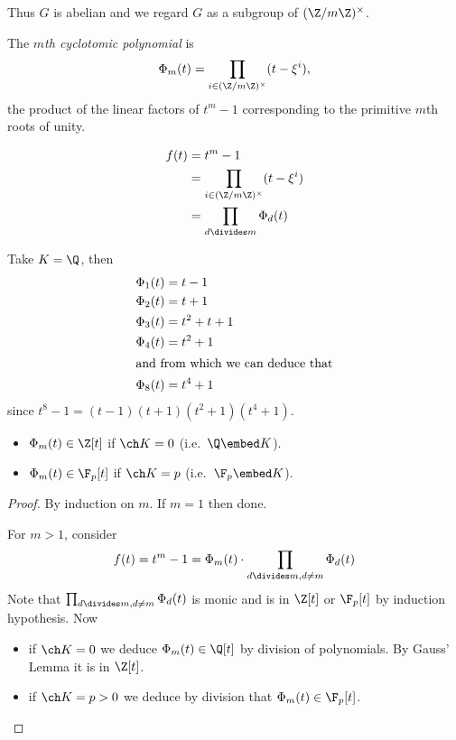 \documentclass[a4paper]{article}
\begin{document}
Thus \(G\) is abelian and we regard \(G\) as a subgroup of \((\Z/m\Z)^\times\).

\begin{definition}
  The \emph{\(m\)th cyclotomic polynomial} is
  \[
    \Phi_m(t) = \prod_{i \in (\Z/m\Z)^\times} (t - \xi^i),
  \]
  the product of the linear factors of \(t^m - 1\) corresponding to the primitive \(m\)th roots of unity.
\end{definition}

\begin{remark}
  \begin{align*}
    f(t) &= t^m - 1 \\
         &= \prod_{i \in (\Z/m\Z)^\times} (t - \xi^i) \\
         &= \prod_{d \divides m} \Phi_d(t)
  \end{align*}
\end{remark}

\begin{eg}
  Take \(K = \Q\), then
  \begin{align*}
    \Phi_1(t) &= t - 1 \\
    \Phi_2(t) &= t + 1 \\
    \Phi_3(t) &= t^2 + t + 1 \\
    \Phi_4(t) &= t^2 + 1 \\
    \intertext{and from which we can deduce that}
    \Phi_8(t) &= t^4 + 1
  \end{align*}
  since \(t^8 - 1 = (t - 1)(t + 1)(t^2 + 1)(t^4 + 1)\).
\end{eg}

\begin{lemma}\leavevmode
  \begin{itemize}
  \item \(\Phi_m(t) \in \Z[t]\) if \(\ch K = 0\) (i.e.\ \(\Q \embed K\)).
  \item \(\Phi_m(t) \in \F_p[t]\) if \(\ch K = p\) (i.e.\ \(\F_p \embed K\)).
  \end{itemize}
\end{lemma}

\begin{proof}
  By induction on \(m\). If \(m = 1\) then done.

  For \(m > 1\), consider
  \[
    f(t) = t^m - 1 =\Phi_m(t) \cdot \prod_{d \divides m, d \neq m} \Phi_d(t)
  \]
  Note that \(\prod_{d \divides m, d \neq m} \Phi_d(t)\) is monic and is in \(\Z[t]\) or \(\F_p[t]\) by induction hypothesis. Now
  \begin{itemize}
  \item if \(\ch K = 0\) we deduce \(\Phi_m(t) \in \Q[t]\) by division of polynomials. By Gauss' Lemma it is in \(\Z[t]\).
  \item if \(\ch K = p > 0\) we deduce by division that \(\Phi_m(t) \in \F_p[t]\).
  \end{itemize}
\end{proof}
\end{document}
